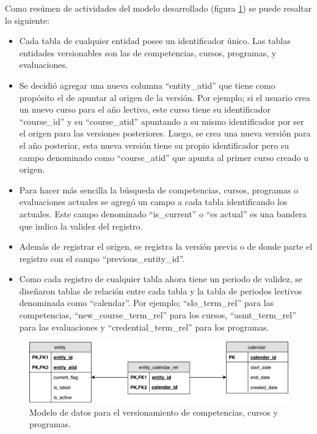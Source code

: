 Como resúmen de actividades del modelo desarrollado (figura \ref{version_model}) se puede resaltar lo siguiente:
\begin{itemize}
	\item Cada tabla de cualquier entidad posee un identificador único. Las tablas entidades versionables son las de competencias, cursos, programas, y evaluaciones.
	\item Se decidió agregar una nueva columna \enquote{entity_atid} que tiene como propósito el de apuntar al origen de la versión. Por ejemplo; si el usuario crea un nuevo curso para el año lectivo, este curso tiene su identificador \enquote{course_id} y su \enquote{course_atid} apuntando a su mismo identificador por ser el origen para las versiones posteriores. Luego, se crea una nueva versión para el año posterior, esta nueva versión tiene su propio identificador pero su campo denominado como \enquote{course_atid} que apunta al primer curso creado u origen.
	\item Para hacer más sencilla la búsqueda de competencias, cursos, programas o evaluaciones actuales se agregó un campo a cada tabla identificando los actuales. Este campo denominado \enquote{is_current} o “es actual” es una bandera que indica la validez del registro.
	\item Además de registrar el origen, se registra la versión previa o de donde parte el registro con el campo \enquote{previous_entity_id}.
	\item Como cada registro de cualquier tabla ahora tiene un periodo de validez, se diseñaron tablas de relación entre cada tabla y la tabla de periodos lectivos denominada como \enquote{calendar}. Por ejemplo; \enquote{slo_term_rel} para las competencias, \enquote{new_course_term_rel} para los cursos, \enquote{asmt_term_rel} para las evaluaciones y \enquote{credential_term_rel} para los programas.
\end{itemize}

\begin{figure}
\centering
\includegraphics[width=125mm,scale=1]{Capitulos/DesarrollodelaAplicacion/Imagenes/version_model}
\caption{Modelo de datos para el versionamiento de competencias, cursos y programas.}
  \label{version_model}
\end{figure}